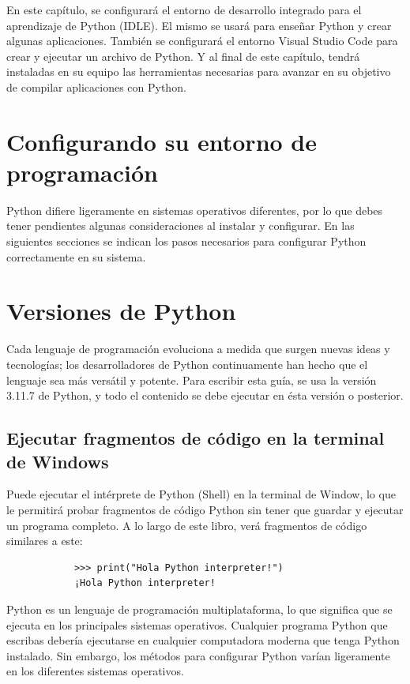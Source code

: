 En este capítulo, se configurará el entorno de desarrollo integrado para el aprendizaje de Python (IDLE). El mismo se usará para enseñar Python y crear algunas aplicaciones. También se configurará el entorno Visual Studio Code para crear y ejecutar un archivo de Python.  Y al final de este capítulo, tendrá instaladas en su equipo las herramientas necesarias para avanzar en su objetivo de compilar aplicaciones con Python.


\section{Configurando su entorno de programación}

Python difiere ligeramente en sistemas operativos diferentes, por lo que debes tener pendientes
algunas consideraciones al instalar y configurar. En las siguientes secciones se indican los pasos necesarios para 
configurar Python correctamente en su sistema.

\section*{Versiones de Python}

Cada lenguaje de programación evoluciona a medida que surgen nuevas ideas y tecnologías; los desarrolladores de Python continuamente han hecho que el lenguaje sea más versátil y potente. Para escribir esta guía, se usa la versión  3.11.7 de Python, y todo el contenido se debe ejecutar en ésta versión o posterior. 



\subsection*{Ejecutar fragmentos de código en la terminal de Windows}\label{terminal}

Puede ejecutar el intérprete de Python (Shell) en la terminal de Window, lo que le permitirá probar
fragmentos de código Python sin tener que guardar y ejecutar un programa completo.
A lo largo de este libro, verá fragmentos de código similares a este:
{\ttfamily\scriptsize\scriptsize 
	\hspace{-0.65cm}\vspace{0.15cm}	
	{\color{black} 	
		\begin{verbatim}
			>>> print("Hola Python interpreter!")
			¡Hola Python interpreter!		
		\end{verbatim}
}}
Python es un lenguaje de programación multiplataforma, lo que significa que se ejecuta en
los principales sistemas operativos. Cualquier programa Python que escribas debería ejecutarse
en cualquier computadora moderna que tenga Python instalado. Sin embargo, los métodos
para configurar Python varían ligeramente  en los diferentes sistemas operativos.

